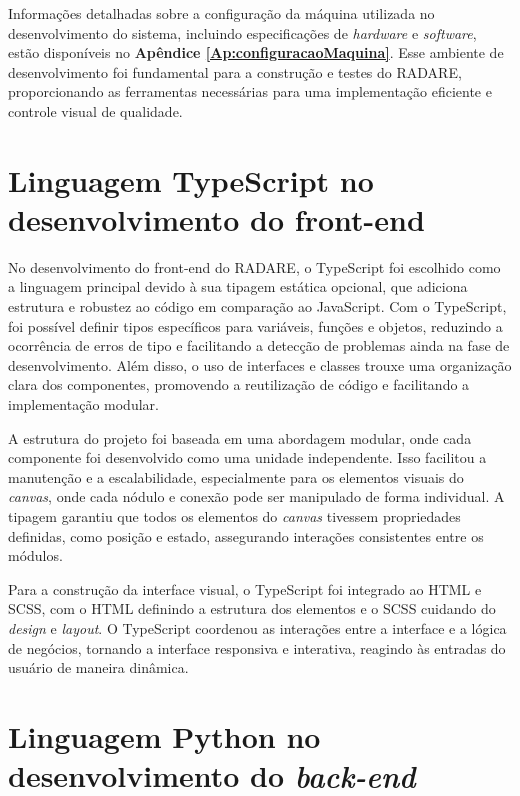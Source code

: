 Informações detalhadas sobre a configuração da máquina utilizada no desenvolvimento do sistema, incluindo especificações de \textit{hardware} e \textit{software}, estão disponíveis no \textbf{Apêndice \ref{Ap:configuracaoMaquina}}. Esse ambiente de desenvolvimento foi fundamental para a construção e testes do RADARE, proporcionando as ferramentas necessárias para uma implementação eficiente e controle visual de qualidade.
    
\section{Linguagem TypeScript no desenvolvimento do front-end}

No desenvolvimento do front-end do RADARE, o TypeScript foi escolhido como a linguagem principal devido à sua tipagem estática opcional, que adiciona estrutura e robustez ao código em comparação ao JavaScript. Com o TypeScript, foi possível definir tipos específicos para variáveis, funções e objetos, reduzindo a ocorrência de erros de tipo e facilitando a detecção de problemas ainda na fase de desenvolvimento. Além disso, o uso de interfaces e classes trouxe uma organização clara dos componentes, promovendo a reutilização de código e facilitando a implementação modular.

A estrutura do projeto foi baseada em uma abordagem modular, onde cada componente foi desenvolvido como uma unidade independente. Isso facilitou a manutenção e a escalabilidade, especialmente para os elementos visuais do \textit{canvas}, onde cada nódulo e conexão pode ser manipulado de forma individual. A tipagem garantiu que todos os elementos do \textit{canvas} tivessem propriedades definidas, como posição e estado, assegurando interações consistentes entre os módulos.

Para a construção da interface visual, o TypeScript foi integrado ao HTML e SCSS, com o HTML definindo a estrutura dos elementos e o SCSS cuidando do \textit{design} e \textit{layout}. O TypeScript coordenou as interações entre a interface e a lógica de negócios, tornando a interface responsiva e interativa, reagindo às entradas do usuário de maneira dinâmica.

\section{Linguagem Python no desenvolvimento do \textit{back-end}}

